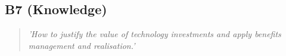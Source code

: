 \subsection*{B7 (Knowledge)}

  \begin{quote}
    \textit{'How to justify the value of technology
    investments and apply benefits management and
    realisation.'}
  \end{quote}

\newpage